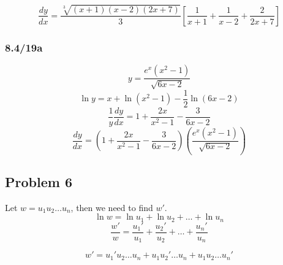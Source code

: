 \documentclass{article}
\begin{document}
\[ \frac{dy}{dx} = \frac{\sqrt[3]{(x+1)(x-2)(2x+7)}}{3} \left[ \frac{1}{x+1} + \frac{1}{x-2} + \frac{2}{2x+7} \right] \]

\subsubsection{8.4/19a}
\[ y = \frac{e^x(x^2-1)}{\sqrt{6x-2}}\]
\[ \ln{y} = x + \ln{(x^2-1)} - \frac{1}{2} \ln{(6x-2)} \]
\[ \frac{1}{y} \frac{dy}{dx} = 1 + \frac{2x}{x^2-1} - \frac{3}{6x-2} \]
\[ \frac{dy}{dx} = \left( 1 + \frac{2x}{x^2-1} - \frac{3}{6x-2} \right) \left( \frac{e^x(x^2-1)}{\sqrt{6x-2}} \right) \]

\subsection{Problem 6}
Let $w = u_1u_2 \dots u_n$, then we need to find $w'$.
\[ \ln{w} = \ln{u_1} + \ln{u_2} + \dots + \ln{u_n}\]
\[ \frac{w'}{w}  = \frac{u_1'}{u_1} + \frac{u_2'}{u_2} + \dots + \frac{u_n'}{u_n} \]

\[ w' = u_1'u_2 \dots u_n + u_1u_2' \dots u_n + u_1u_2 \dots u_n' \]
\end{document}
